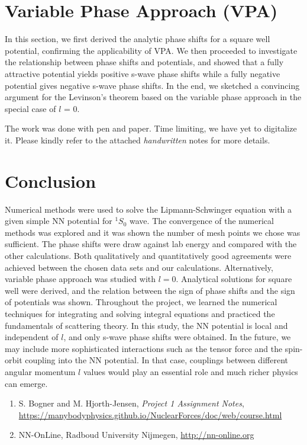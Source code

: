 \documentclass{article}
\begin{document}
\begin{multicols}{2}
\section{Variable Phase Approach (VPA)}
In this section, we first derived the analytic phase shifts for a square well potential, confirming the applicability of VPA. We then proceeded to investigate the relationship between phase shifts and potentials, and showed that a fully attractive potential yields positive s-wave phase shifts while a fully negative potential gives negative s-wave phase shifts. In the end, we sketched a convincing argument for the Levinson's theorem based on the variable phase approach in the special case of $l$ = 0. 

The work was done with pen and paper. Time limiting, we have yet to digitalize it. Please kindly refer to the attached \emph{handwritten} notes for more details.


\clearpage
\section{Conclusion}
Numerical methods were used to solve the Lipmann-Schwinger equation with a given simple NN potential for $^1S_0$ wave. The convergence of the numerical methods was explored and it was shown the number of mesh points we chose was sufficient. The phase shifts were draw against lab energy and compared with the other calculations. Both qualitatively and quantitatively good agreements were achieved between the chosen data sets and our calculations. Alternatively, variable phase approach was studied with $l=0$. Analytical solutions for square well were derived, and the relation between the sign of phase shifts and the sign of potentials was shown. Throughout the project, we learned the numerical techniques for integrating and solving integral equations and practiced the fundamentals of scattering theory. In this study, the NN potential is local and independent of $l$, and only s-wave phase shifts were obtained. In the future, we may include more sophisticated interactions such as the tensor force and the spin-orbit coupling into the NN potential. In that case, couplings between different angular momentum $l$ values would play an essential role and much richer physics can emerge. 

\end{multicols}

\hrulefill

\begin{enumerate} %

\item S. Bogner and M. Hjorth-Jensen, \textit{Project 1 Assignment Notes}, \url{https://manybodyphysics.github.io/NuclearForces/doc/web/course.html}

\item NN-OnLine, Radboud University Nijmegen, \url{http://nn-online.org}

\end{enumerate}
\end{document}
